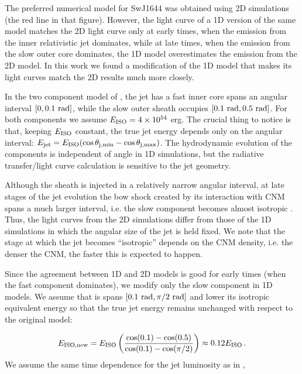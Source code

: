 \documentclass[usenatbib,fleqn]{mnras}
\begin{document}
The preferred numerical model for SwJ1644 \citep[Fig.10
in][]{Mimica+2015} was obtained using 2D simulations (the red line in
that figure). However, the light curve of a 1D version of the same
model \citep[black line in Fig. 10 in][see also section 4.2 of that
paper]{Mimica+2015} matches the 2D light curve only at early times,
when the emission from the inner relativistic jet dominates, while at
late times, when the emission from the slow outer core dominates, the
1D model overestimates the emission from the 2D model. In this work we
found a modification of the 1D model that makes its light curves
match the 2D results much more closely.

In the two component model of \citet{Mimica+2015}, the jet has a fast
inner core spans an angular interval $[0, 0.1\ {\rm rad}]$, while the
slow outer sheath occupies $[0.1\ {\rm rad}, 0.5\ {\rm rad}]$. For
both components we assume $E_{\rm ISO} = 4\times 10^{54}$ erg. The
crucial thing to notice is that, keeping $E_{\rm ISO}$ constant, the
true jet energy depends only on the angular interval: $E_{\rm jet} =
E_{\rm ISO} (\cos\theta_{\rm j,min} - \cos\theta_{\rm j,max})$. The
hydrodynamic evolution of the components is independent of angle in 1D
simulations, but the radiative transfer/light curve calculation is
sensitive to the jet geometry.

Although the sheath is injected in a relatively
narrow angular interval, at late stages of the jet evolution the bow
shock created by its interaction with CNM spans a much larger interval,
i.e. the slow component becomes almost isotropic \citep[bottom two
panels in Fig. 8 in][]{Mimica+2015}. Thus, the light curves from the
2D simulations differ from those of the 1D simulations in which the
angular size of the jet is held fixed. We note that the stage at
which the jet becomes ``isotropic'' depends on the CNM density,
i.e. the denser the CNM, the faster this is expected to happen.

Since the agreement between 1D and 2D models is good for early times
(when the fast component dominates), we modify only the slow component
in 1D models. We assume that is spans $[0.1\ {\rm rad}, \pi/2\ {\rm
  rad}]$ and lower its isotropic equivalent energy so that the true
jet energy remains unchanged with respect to the original model:

\begin{equation}\label{eq:Eiso}
 E_{\rm ISO, new} = E_{\rm ISO} \left(\frac{\cos(0.1) - \cos(0.5)}{\cos(0.1) - \cos(\pi/2)}\right)\approx 0.12 E_{\rm ISO}\, .
\end{equation}
%
We assume the same time dependence for the jet luminosity as in
\citet{Mimica+2015},
\end{document}
